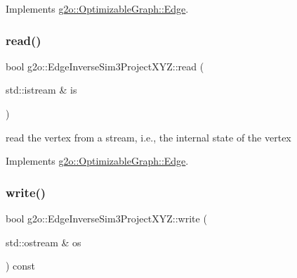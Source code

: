 Implements \mbox{\hyperlink{classg2o_1_1_optimizable_graph_1_1_edge_a1e6d9f4128866982de5e11e03edd7775}{g2o\+::\+Optimizable\+Graph\+::\+Edge}}.

\mbox{\label{classg2o_1_1_edge_inverse_sim3_project_x_y_z_ac229f31599a4f08eebe8f9b239d883f6}} 
\subsubsection{\texorpdfstring{read()}{read()}}
{\footnotesize\ttfamily bool g2o\+::\+Edge\+Inverse\+Sim3\+Project\+X\+Y\+Z\+::read (\begin{DoxyParamCaption}\item[{std\+::istream \&}]{is }\end{DoxyParamCaption})\hspace{0.3cm}{\ttfamily [virtual]}}



read the vertex from a stream, i.\+e., the internal state of the vertex 



Implements \mbox{\hyperlink{classg2o_1_1_optimizable_graph_1_1_edge_a30cf69b762a06aa35e796d8af71632b0}{g2o\+::\+Optimizable\+Graph\+::\+Edge}}.

\mbox{\label{classg2o_1_1_edge_inverse_sim3_project_x_y_z_a71ce5fa6b21a59c0cfffdc2b7e8a2024}} 
\subsubsection{\texorpdfstring{write()}{write()}}
{\footnotesize\ttfamily bool g2o\+::\+Edge\+Inverse\+Sim3\+Project\+X\+Y\+Z\+::write (\begin{DoxyParamCaption}\item[{std\+::ostream \&}]{os }\end{DoxyParamCaption}) const\hspace{0.3cm}{\ttfamily [virtual]}}



